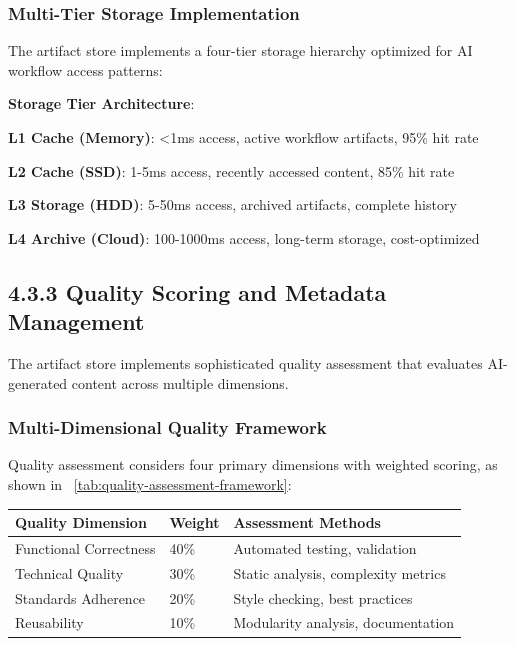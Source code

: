 \subsubsection*{Multi-Tier Storage Implementation}

The artifact store implements a four-tier storage hierarchy optimized for AI workflow access patterns:

\begin{alertbox}
\textbf{Storage Tier Architecture}:
\begin{compactlist}
    \item \textbf{L1 Cache (Memory)}: <1ms access, active workflow artifacts, 95\% hit rate
    \item \textbf{L2 Cache (SSD)}: 1-5ms access, recently accessed content, 85\% hit rate
    \item \textbf{L3 Storage (HDD)}: 5-50ms access, archived artifacts, complete history
    \item \textbf{L4 Archive (Cloud)}: 100-1000ms access, long-term storage, cost-optimized
\end{compactlist}
\end{alertbox}

\subsection*{4.3.3 Quality Scoring and Metadata Management}

The artifact store implements sophisticated quality assessment that evaluates AI-generated content across multiple dimensions.

\subsubsection*{Multi-Dimensional Quality Framework}

Quality assessment considers four primary dimensions with weighted scoring, as shown in ~\ref{tab:quality-assessment-framework}:

\begin{center}
\begin{tabular}{@{}lll@{}}
\toprule
\textbf{Quality Dimension} & \textbf{Weight} & \textbf{Assessment Methods} \\
\midrule
Functional Correctness & 40\% & Automated testing, validation \\
Technical Quality & 30\% & Static analysis, complexity metrics \\
Standards Adherence & 20\% & Style checking, best practices \\
Reusability & 10\% & Modularity analysis, documentation \\
\bottomrule
\end{tabular}
\label{tab:quality-assessment-framework}
\end{center}

